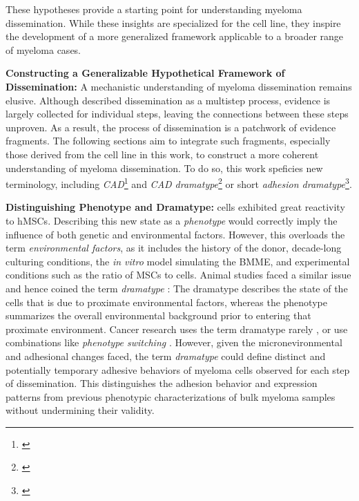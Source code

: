 These hypotheses  provide a
starting point for understanding myeloma dissemination. While these insights are
specialized for the \INA cell line, they inspire the development of a more
generalized framework applicable to a broader range of myeloma cases.



\textbf{Constructing a Generalizable Hypothetical Framework of Dissemination:}
A mechanistic understanding of myeloma dissemination remains elusive. Although
\citet{zeissigTumourDisseminationMultiple2020} described dissemination as a
multistep process, evidence is largely collected for individual steps, leaving
the connections between these steps unproven. As a result, the process of
dissemination is a patchwork of evidence fragments. The following sections aim
to integrate such fragments, especially those derived from the \INA cell line in
this work, to construct a more coherent understanding of myeloma dissemination.
To do so, this work speficies new terminology, including
\emph{\acf{CAD}}\footnote{\footcad\label{foot:cad}}
and \emph{\ac{CAD} dramatype}\footnote{\footcaddt\label{foot:caddt}}
or short \emph{adhesion dramatype}\footnote{\footadhesiondt\label{foot:adhesiondt}}.



\textbf{Distinguishing Phenotype and Dramatype:}
\INA cells exhibited great reactivity to \acp{hMSC}. Describing this new state
as a \emph{phenotype} would correctly imply the influence of both genetic and
environmental factors. However, this overloads the term \emph{environmental
      factors}, as it includes the history of the donor, decade-long culturing
conditions, the \textit{in vitro} model simulating the \ac{BMME}, and
experimental conditions such as the ratio of \acp{MSC} to \INA cells. Animal
studies faced a similar issue and hence coined the term
\emph{dramatype}
\cite{zutphenPrinciplesLaboratoryAnimal2001}: The dramatype describes the state
of the cells that is due to proximate environmental factors, whereas the
phenotype summarizes the overall environmental background prior to entering that
proximate environment. Cancer research uses the term dramatype rarely
\cite{hinoStudiesFamilialTumors2004}, or use combinations like \emph{phenotype
      switching} \cite{woutersRobustGeneExpression2020}. However, given the
micronevironmental and adhesional changes faced, the term \emph{dramatype} could
define distinct and potentially temporary adhesive behaviors of
myeloma cells observed for each step of dissemination. This distinguishes the
adhesion behavior and expression patterns from previous phenotypic
characterizations of bulk myeloma samples without undermining their validity.



